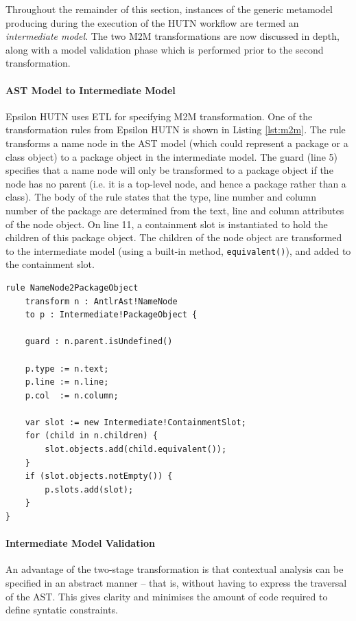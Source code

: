 Throughout the remainder of this section, instances of the generic metamodel producing during the execution of the HUTN workflow are termed an \textit{intermediate model}. The two M2M transformations are now discussed in depth, along with a model validation phase which is performed prior to the second transformation.

\paragraph{AST Model to Intermediate Model}
Epsilon HUTN uses ETL \cite{kolovos08etl} for specifying M2M transformation. One of the transformation rules from Epsilon HUTN is shown in Listing \ref{lst:m2m}. The rule transforms a name node in the AST model (which could represent a package or a class object) to a package object in the intermediate model. The guard (line 5) specifies that a name node will only be transformed to a package object if the node has no parent (i.e. it is a top-level node, and hence a package rather than a class). The body of the rule states that the type, line number and column number of the package are determined from the text, line and column attributes of the node object. On line 11, a containment slot is instantiated to hold the children of this package object. The children of the node object are transformed to the intermediate model (using a built-in method, \verb|equivalent()|), and added to the containment slot.

\begin{lstlisting}[caption=Transforming Nodes to PackageObjects with ETL., label=lst:m2m, language=ETL]
rule NameNode2PackageObject
    transform n : AntlrAst!NameNode
    to p : Intermediate!PackageObject {

    guard : n.parent.isUndefined()

    p.type := n.text;
    p.line := n.line;
    p.col  := n.column;

    var slot := new Intermediate!ContainmentSlot;
    for (child in n.children) {
        slot.objects.add(child.equivalent());
    }
    if (slot.objects.notEmpty()) {
        p.slots.add(slot);
    }
}
\end{lstlisting}

\paragraph{Intermediate Model Validation}
An advantage of the two-stage transformation is that contextual analysis can be specified in an abstract manner -- that is, without having to express the traversal of the AST. This gives clarity and minimises the amount of code required to define syntatic constraints.

